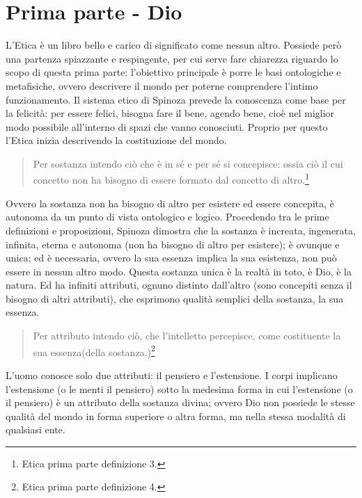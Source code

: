 \section[Dio]{Prima parte - Dio}
\bigskip

L'Etica è un libro bello e carico di significato come nessun altro. Possiede però una partenza spiazzante e respingente, per cui serve fare chiarezza riguardo lo scopo di questa prima parte: l'obiettivo principale è porre le basi ontologiche e metafisiche, ovvero descrivere il mondo per poterne comprendere l'intimo funzionamento. Il sistema etico di Spinoza prevede la conoscenza come base per la felicità: per essere felici, bisogna fare il bene, agendo bene, cioè nel miglior modo possibile all'interno di spazi che vanno conosciuti. Proprio per questo l'Etica inizia descrivendo la costituzione del mondo.

\begin{quotation}
\small	Per sostanza intendo ciò che è in sé e per sé si concepisce: ossia ciò il cui concetto non ha bisogno di essere formato dal concetto di altro.\footnote{Etica prima parte definizione 3.}
\end{quotation}

Ovvero la sostanza non ha bisogno di altro per esistere ed essere concepita, è autonoma da un punto di vista ontologico e logico. Procedendo tra le prime definizioni e proposizioni, Spinoza dimostra che la sostanza è increata, ingenerata, infinita, eterna e autonoma (non ha bisogno di altro per esistere); è ovunque e unica; ed è necessaria, ovvero la sua essenza implica la sua esistenza, non può essere in nessun altro modo.
Questa sostanza unica è la realtà in toto, è Dio, è la natura. 
Ed ha infiniti attributi, ognuno distinto dall'altro (sono concepiti senza il bisogno di altri attributi), che esprimono qualità semplici della sostanza, la sua essenza.

\begin{quotation}
	\small Per attributo intendo ciò, che l'intelletto percepisce, come costituente la sua essenza(della sostanza.)\footnote{Etica prima parte definizione 4.}
\end{quotation}

L'uomo conosce solo due attributi: il pensiero e l'estensione. I corpi implicano l'estensione (o le menti il pensiero) sotto la medesima forma in cui l'estensione (o il pensiero) è un attributo della sostanza divina; ovvero Dio non possiede le stesse qualità del mondo in forma superiore o altra forma, ma nella stessa modalità di qualsiasi ente.

